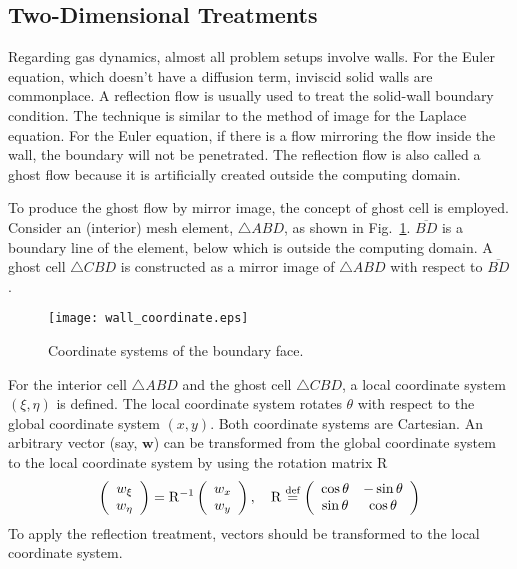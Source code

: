 \documentclass[a4paper,12pt,dvips]{article}
\newcommand*\defeq{\buildrel{\text{def}}\over{=}}
\begin{document}
\subsection{Two-Dimensional Treatments}

Regarding gas dynamics, almost all problem setups involve walls.  For the Euler
equation, which doesn't have a diffusion term, inviscid solid walls are
commonplace.  A reflection flow is usually used to treat the solid-wall
boundary condition\cite{laney_computational_1998}.  The technique is similar to
the method of image for the Laplace equation.  For the Euler equation, if there
is a flow mirroring the flow inside the wall, the boundary will not be
penetrated.  The reflection flow is also called a ghost flow because it is
artificially created outside the computing domain.

To produce the ghost flow by mirror image, the concept of ghost cell is
employed.  Consider an (interior) mesh element, $\bigtriangleup ABD$, as shown
in Fig.~\ref{f:wall_coordinate}.  $\overline{BD}$ is a boundary line of the
element, below which is outside the computing domain.  A ghost cell
$\bigtriangleup CBD$ is constructed as a mirror image of $\bigtriangleup ABD$
with respect to $\overline{BD}$.

\begin{figure}[htbp]
\centering
\texttt{[image: wall\_coordinate.eps]}
\caption{Coordinate systems of the boundary face.}
\label{f:wall_coordinate}
\end{figure}

For the interior cell $\bigtriangleup ABD$ and the ghost cell $\bigtriangleup
CBD$, a local coordinate system $(\xi, \eta)$ is defined.  The local coordinate
system rotates $\theta$ with respect to the global coordinate system $(x, y)$.
Both coordinate systems are Cartesian.  An arbitrary vector (say, $\mathbf{w}$)
can be transformed from the global coordinate system to the local coordinate
system by using the rotation matrix $\mathrm{R}$
\begin{align*}
\left(\begin{array}{c} w_{\xi} \\ w_{\eta} \end{array}\right)
= \mathrm{R}^{-1}
\left(\begin{array}{c} w_x \\ w_y \end{array}\right), \quad
\mathrm{R} \defeq \left(\begin{array}{cc}
  \cos\theta & -\sin\theta \\ \sin\theta & \cos\theta
\end{array}\right)
\end{align*}
To apply the reflection treatment, vectors should be transformed to the local
coordinate system.
\end{document}
